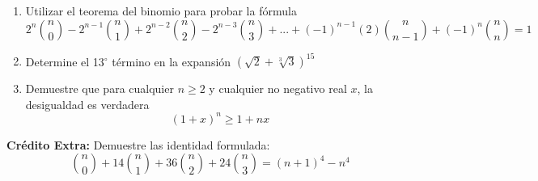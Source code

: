 \begin{enumerate}
    \item Utilizar el teorema del binomio para probar la fórmula
    \[2^{n} \binom{n}{0} - 2^{n-1} \binom{n}{1} + 2^{n-2} \binom{n}{2} - 2^{n-3} \binom{n}{3} + ... + (-1)^{n-1} (2) \binom{n}{n-1} + (-1)^{n} \binom{n}{n} = 1\]
    \item Determine el 13$^\circ$ término en la expansión $(\sqrt{2}+\sqrt[3]{3})^{15}$
    \item Demuestre que para cualquier $n\geq 2$ y cualquier no negativo real $x$, la desigualdad es verdadera \[(1+x)^n\geq 1 + nx\] 
\end{enumerate}

\textbf{Crédito Extra:} Demuestre las identidad formulada:\[\binom{n}{0}+14\binom{n}{1}+36\binom{n}{2}+24\binom{n}{3}=(n+1)^4-n^4\]